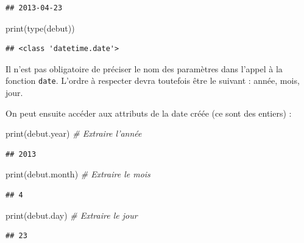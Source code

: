 \documentclass[12pt,]{book}
\newenvironment{Shaded}{\begin{snugshade}}{\end{snugshade}}
\newcommand{\CommentTok}[1]{\textcolor[rgb]{0.56,0.35,0.01}{\textit{#1}}}
\newcommand{\BuiltInTok}[1]{#1}
\newcommand{\NormalTok}[1]{#1}
\numberwithin{equation}{section}
\numberwithin{countremarque}{section}
\let\BeginKnitrBlock\begin \let\EndKnitrBlock\end
\begin{document}
\begin{lstlisting}
## 2013-04-23
\end{lstlisting}

\begin{Shaded}
\begin{Highlighting}[]
\BuiltInTok{print}\NormalTok{(}\BuiltInTok{type}\NormalTok{(debut))}
\end{Highlighting}
\end{Shaded}

\begin{lstlisting}
## <class 'datetime.date'>
\end{lstlisting}

\BeginKnitrBlock{remarque}
Il n'est pas obligatoire de préciser le nom des paramètres dans l'appel
à la fonction \texttt{date}. L'ordre à respecter devra toutefois être le
suivant : année, mois, jour.
\EndKnitrBlock{remarque}

On peut ensuite accéder aux attributs de la date créée (ce sont des
entiers) :

\begin{Shaded}
\begin{Highlighting}[]
\BuiltInTok{print}\NormalTok{(debut.year) }\CommentTok{# Extraire l'année}
\end{Highlighting}
\end{Shaded}

\begin{lstlisting}
## 2013
\end{lstlisting}

\begin{Shaded}
\begin{Highlighting}[]
\BuiltInTok{print}\NormalTok{(debut.month) }\CommentTok{# Extraire le mois}
\end{Highlighting}
\end{Shaded}

\begin{lstlisting}
## 4
\end{lstlisting}

\begin{Shaded}
\begin{Highlighting}[]
\BuiltInTok{print}\NormalTok{(debut.day) }\CommentTok{# Extraire le jour}
\end{Highlighting}
\end{Shaded}

\begin{lstlisting}
## 23
\end{lstlisting}
\end{document}
